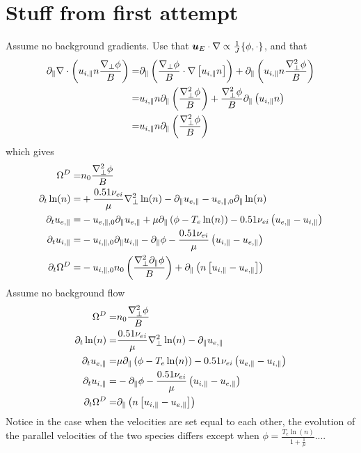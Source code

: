 \section{Stuff from first attempt}
%
Assume no background gradients. Use that $\boldsymbol{u}_E\cdot\nabla \propto \frac{1}{J}\{\phi,\cdot\}$, and that
%
\begin{align*}
  \partial_\|\nabla\cdot \left( u_{i,\|}n \frac{\nabla_\perp \phi}{B}\right)
  =&
  \partial_\|\left(\frac{\nabla_\perp \phi}{B}\cdot\nabla \left[ u_{i,\|}n \right]\right)
  +
  \partial_\|\left(u_{i,\|}n  \frac{\nabla_\perp^2 \phi}{B}\right)
  \\
  =&
  u_{i,\|}n \partial_\|\left(\frac{\nabla_\perp^2 \phi}{B}\right)
  +
  \frac{\nabla_\perp^2 \phi}{B} \partial_\|\left(u_{i,\|}n  \right)
  \\
  =&
  u_{i,\|}n \partial_\|\left(\frac{\nabla_\perp^2 \phi}{B}\right)
\end{align*}
%
which gives
%
\begin{align*}
\Om^D =&
n_0\frac{\grad_\perp^2\phi}{B}
\\
%
%
%
\partial_t \ln(n)
=&
 +\frac{0.51\nu_{ei}}{\mu}
   \grad_\perp^2 \ln(n)
- \partial_\|u_{e,\|}
- u_{e,\|,0} \partial_\| \ln(n)
\\
%
%
%
\partial_t u_{e,\|}
 =&
 - u_{e,\|,0} \partial_\| u_{e,\|}
 + \mu \partial_\| \L(\phi - T_e  \ln(n)\R)
 - 0.51 \nu_{ei} \L(u_{e,\|}-u_{i,\|}\R)
\\
%
%
%
\partial_t u_{i,\|}
 =&
 - u_{i,\|,0} \partial_\| u_{i,\|}
 - \partial_\|\phi
 - \frac{ 0.51 \nu_{ei} }{ \mu } \L(u_{i,\|}-u_{e,\|}\R)
\\
%
%
%
  \partial_t \Om^D
  =&
  - u_{i,\|,0}n_0 \L(\frac{\grad_\perp^2 \partial_\| \phi}{B}\R)
 + \partial_\| \L(n\L[ u_{i,\|} - u_{e,\|} \R]\R)
\end{align*}
%
Assume no background flow
%
\begin{align*}
\Om^D =&
n_0\frac{\grad_\perp^2\phi}{B}
\\
%
%
%
\partial_t \ln(n)
=&
 \frac{0.51\nu_{ei}}{\mu}
   \grad_\perp^2 \ln(n)
- \partial_\|u_{e,\|}
\\
%
%
%
\partial_t u_{e,\|}
 =&
 \mu \partial_\| \L(\phi - T_e  \ln(n)\R)
 - 0.51 \nu_{ei} \L(u_{e,\|}-u_{i,\|}\R)
\\
%
%
%
\partial_t u_{i,\|}
 =&
 - \partial_\|\phi
 - \frac{ 0.51 \nu_{ei} }{ \mu } \L(u_{i,\|}-u_{e,\|}\R)
\\
%
%
%
  \partial_t \Om^D
  =&
 \partial_\| \L(n\L[ u_{i,\|} - u_{e,\|} \R]\R)
\end{align*}
%
Notice in the case when the velocities are set equal to each other, the evolution of the parallel velocities of the two species differs except when $\phi = \frac{T_e\ln(n)}{1+\frac{1}{\mu}}$....

